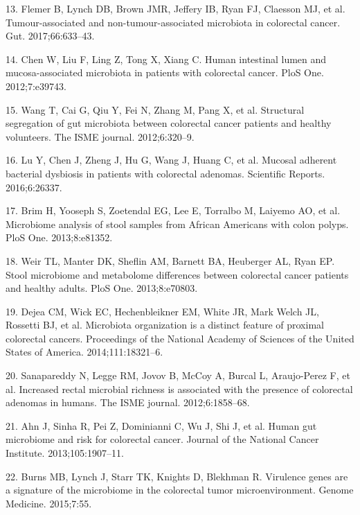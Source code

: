 \documentclass[12pt,]{article}
\begin{document}
\hypertarget{ref-flemer_tumour-associated_2017}{}
13. Flemer B, Lynch DB, Brown JMR, Jeffery IB, Ryan FJ, Claesson MJ, et
al. Tumour-associated and non-tumour-associated microbiota in colorectal
cancer. Gut. 2017;66:633--43.

\hypertarget{ref-chen_human_2012}{}
14. Chen W, Liu F, Ling Z, Tong X, Xiang C. Human intestinal lumen and
mucosa-associated microbiota in patients with colorectal cancer. PloS
One. 2012;7:e39743.

\hypertarget{ref-wang_structural_2012}{}
15. Wang T, Cai G, Qiu Y, Fei N, Zhang M, Pang X, et al. Structural
segregation of gut microbiota between colorectal cancer patients and
healthy volunteers. The ISME journal. 2012;6:320--9.

\hypertarget{ref-lu_mucosal_2016}{}
16. Lu Y, Chen J, Zheng J, Hu G, Wang J, Huang C, et al. Mucosal
adherent bacterial dysbiosis in patients with colorectal adenomas.
Scientific Reports. 2016;6:26337.

\hypertarget{ref-brim_microbiome_2013}{}
17. Brim H, Yooseph S, Zoetendal EG, Lee E, Torralbo M, Laiyemo AO, et
al. Microbiome analysis of stool samples from African Americans with
colon polyps. PloS One. 2013;8:e81352.

\hypertarget{ref-weir_stool_2013}{}
18. Weir TL, Manter DK, Sheflin AM, Barnett BA, Heuberger AL, Ryan EP.
Stool microbiome and metabolome differences between colorectal cancer
patients and healthy adults. PloS One. 2013;8:e70803.

\hypertarget{ref-dejea_microbiota_2014}{}
19. Dejea CM, Wick EC, Hechenbleikner EM, White JR, Mark Welch JL,
Rossetti BJ, et al. Microbiota organization is a distinct feature of
proximal colorectal cancers. Proceedings of the National Academy of
Sciences of the United States of America. 2014;111:18321--6.

\hypertarget{ref-sanapareddy_increased_2012}{}
20. Sanapareddy N, Legge RM, Jovov B, McCoy A, Burcal L, Araujo-Perez F,
et al. Increased rectal microbial richness is associated with the
presence of colorectal adenomas in humans. The ISME journal.
2012;6:1858--68.

\hypertarget{ref-ahn_human_2013}{}
21. Ahn J, Sinha R, Pei Z, Dominianni C, Wu J, Shi J, et al. Human gut
microbiome and risk for colorectal cancer. Journal of the National
Cancer Institute. 2013;105:1907--11.

\hypertarget{ref-burns_virulence_2015}{}
22. Burns MB, Lynch J, Starr TK, Knights D, Blekhman R. Virulence genes
are a signature of the microbiome in the colorectal tumor
microenvironment. Genome Medicine. 2015;7:55.
\end{document}
